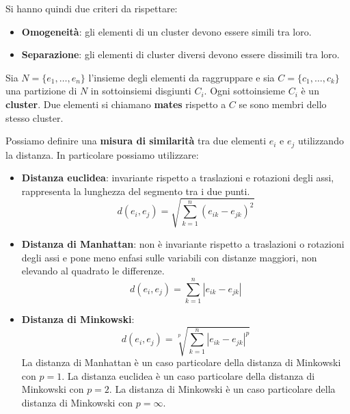 Si hanno quindi due criteri da rispettare:
\begin{itemize}
    \item \textbf{Omogeneità}: gli elementi di un cluster devono essere simili tra loro.
    \item \textbf{Separazione}: gli elementi di cluster diversi devono essere dissimili tra loro.
\end{itemize}
\begin{definizione}
    Sia $N = \{e_1, \dots, e_n\}$ l'insieme degli elementi da raggruppare e sia
    $C = \{c_1, \dots, c_k\}$ una partizione di $N$ in sottoinsiemi disgiunti
    $C_i$. Ogni sottoinsieme $C_i$ è un \textbf{cluster}. Due elementi si chiamano
    \textbf{mates} rispetto a $C$ se sono membri dello stesso cluster.
\end{definizione}
\begin{definizione}
    Possiamo definire una \textbf{misura di similarità} tra due elementi $e_i$ e
    $e_j$ utilizzando la distanza. In particolare possiamo utilizzare:
    \begin{itemize}
        \item \textbf{Distanza euclidea}: invariante rispetto a traslazioni e
              rotazioni degli assi, rappresenta la lunghezza del segmento tra i due punti.
              \begin{equation}
                  d(e_i, e_j) = \sqrt{\sum_{k=1}^n (e_{ik} - e_{jk})^2}
              \end{equation}
        \item \textbf{Distanza di Manhattan}: non è invariante rispetto a traslazioni
              o rotazioni degli assi e pone meno enfasi sulle variabili con distanze maggiori,
              non elevando al quadrato le differenze.
              \begin{equation}
                  d(e_i, e_j) = \sum_{k=1}^n |e_{ik} - e_{jk}|
              \end{equation}
        \item \textbf{Distanza di Minkowski}:
              \begin{equation}
                  d(e_i, e_j) = \sqrt[p]{\sum_{k=1}^n |e_{ik} - e_{jk}|^p}
              \end{equation}
              La distanza di Manhattan è un caso particolare della distanza di
              Minkowski con $p=1$. La distanza euclidea è un caso particolare della
              distanza di Minkowski con $p=2$. La distanza di Minkowski è un caso
              particolare della distanza di Minkowski con $p=\infty$.
    \end{itemize}
\end{definizione}
